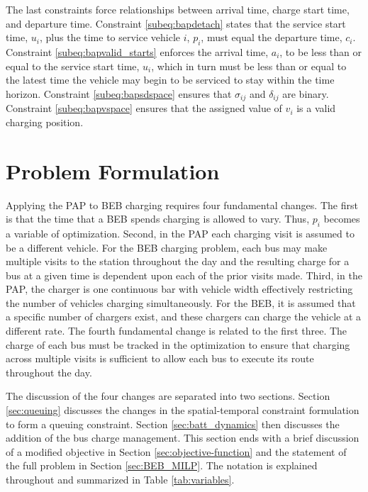 \documentclass[utf8]{FrontiersinHarvard}
\begin{document}
The last constraints force relationships between arrival time, charge start time, and departure time. Constraint
\eqref{subeq:bapdetach} states that the service start time, $u_i$, plus the time to service vehicle $i$, $p_i$, must
equal the departure time, $c_i$. Constraint \eqref{subeq:bapvalid_starts} enforces the arrival time, $a_i$, to be less
than or equal to the service start time, $u_i$, which in turn must be less than or equal to the latest time the vehicle
may begin to be serviced to stay within the time horizon. Constraint \eqref{subeq:bapsdspace} ensures that $\sigma_{ij}$ and
$\delta_{ij}$ are binary. Constraint \eqref{subeq:bapvspace} ensures that the assigned value of $v_i$ is a valid charging
position.

%
\section{Problem Formulation}  \label{sec:problemformulation}
Applying the PAP to BEB charging requires four fundamental changes. The first is that the time that a BEB spends
charging is allowed to vary. Thus, $p_i$ becomes a variable of optimization. Second, in the PAP each charging visit is
assumed to be a different vehicle. For the BEB charging problem, each bus may make multiple visits to the station
throughout the day and the resulting charge for a bus at a given time is dependent upon each of the prior visits made.
Third, in the PAP, the charger is one continuous bar with vehicle width effectively restricting the number of vehicles
charging simultaneously. For the BEB, it is assumed that a specific number of chargers exist, and these chargers can
charge the vehicle at a different rate. The fourth fundamental change is related to the first three. The charge of each
bus must be tracked in the optimization to ensure that charging across multiple visits is sufficient to allow each bus
to execute its route throughout the day.

The discussion of the four changes are separated into two sections. Section \ref{sec:queuing} discusses the changes in
the spatial-temporal constraint formulation to form a queuing constraint. Section \ref{sec:batt_dynamics} then discusses
the addition of the bus charge management. This section ends with a brief discussion of a modified objective in Section
\ref{sec:objective-function} and the statement of the full problem in Section \ref{sec:BEB_MILP}. The notation is
explained throughout and summarized in Table \ref{tab:variables}.
\end{document}
